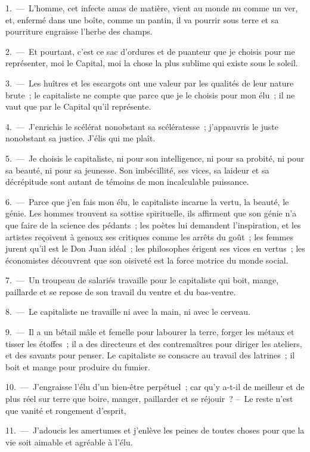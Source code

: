 \documentclass[french,twoside]{book} %
\begin{document}
1. — L'homme, cet infecte amas de matière, vient au monde nu comme un ver, et, enfermé dans une boîte, comme un pantin, il va pourrir sous terre et sa pourriture engraisse l’herbe des champs.\par
2. — Et pourtant, c’est ce sac d’ordures et de puanteur que je choisis pour me représenter, moi le Capital, moi la chose la plus sublime qui existe sous le soleil.\par
3. — Les huîtres et les escargots ont une valeur par les qualités de leur nature brute ; le capitaliste ne compte que parce que je le choisis pour mon élu ; il ne vaut que par le Capital qu’il représente.\par
4. — J'enrichis le scélérat nonobstant sa scélératesse ; j’appauvris le juste nonobstant sa justice. J'élis qui me plaît.\par
5. — Je choisis le capitaliste, ni pour son intelligence, ni pour sa probité, ni pour sa beauté, ni pour sa jeunesse. Son imbécillité, ses vices, sa laideur et sa décrépitude sont autant de témoins de mon incalculable puissance.\par
6. — Parce que j’en fais mon élu, le capitaliste incarne la vertu, la beauté, le génie. Les hommes trouvent sa sottise spirituelle, ils affirment que son génie n’a que faire de la science des pédants ; les poètes lui demandent l’inspiration, et les artistes reçoivent à genoux ses critiques comme les arrêts du goût ; les femmes jurent qu’il est le Don Juan idéal ; les philosophes érigent ses vices en vertus ; les économistes découvrent que son oisiveté est la force motrice du monde social.\par
7. — Un troupeau de salariés travaille pour le capitaliste qui boit, mange, paillarde et se repose de son travail du ventre et du bas-ventre.\par
8. — Le capitaliste ne travaille ni avec la main, ni avec le cerveau.\par
9. — Il a un bétail mâle et femelle pour labourer la terre, forger les métaux et tisser les étoffes ; il a des directeurs et des contremaîtres pour diriger les ateliers, et des savants pour penser. Le capitaliste se consacre au travail des latrines ; il boit et mange pour produire du fumier.\par
10. — J'engraisse l’élu d’un bien-être perpétuel ; car qu’y a-t-il de meilleur et de plus réel sur terre que boire, manger, paillarder et se réjouir ? – Le reste n’est que vanité et rongement d’esprit,\par
11. — J'adoucis les amertumes et j’enlève les peines de toutes choses pour que la vie soit aimable et agréable à l’élu.\par
\end{document}

